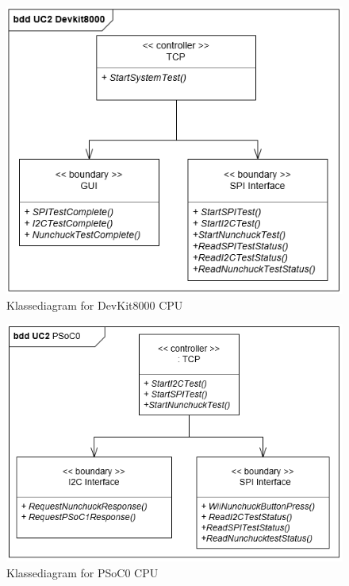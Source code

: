 \begin{figure}[H]
	\centering
	\includegraphics[width=\textwidth]{SystemArkitektur/images/DevKit8000ClassDiagram}
	\caption{Klassediagram for DevKit8000 CPU}
	\label{figure:initialKlassediagramDevkit}
\end{figure}

\begin{figure}[H]
	\centering
	\includegraphics[width=\textwidth]{SystemArkitektur/images/klassediagramPSoC0}
	\caption{Klassediagram for PSoC0 CPU}
	\label{figure:initialKlassediagramPSoC0}
\end{figure}

